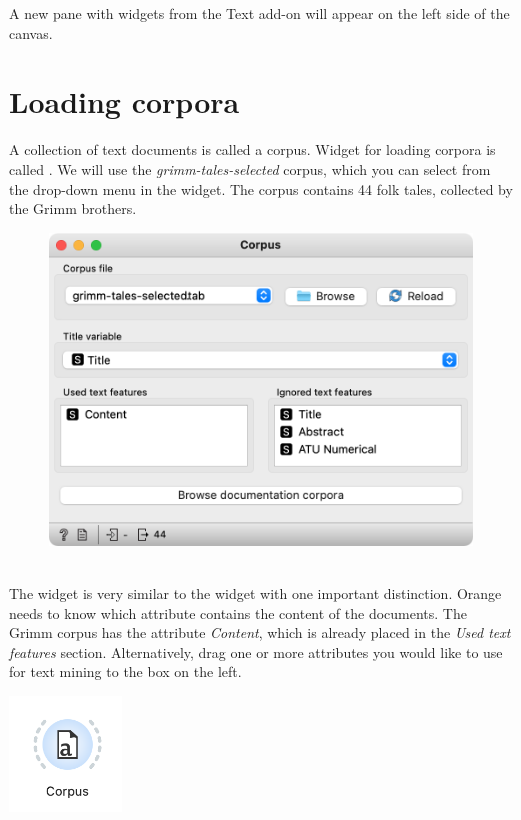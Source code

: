 A new pane with widgets from the Text add-on will appear on the left side of the canvas.

\newpage

\section{Loading corpora}

A collection of text documents is called a corpus. Widget for loading corpora is called . We will use the \emph{grimm-tales-selected} corpus, which you can select from the drop-down menu in the widget. The corpus contains 44 folk tales, collected by the Grimm brothers.

\vspace{-0.2cm}
\begin{figure}[h]
  \centering
  \includegraphics[width=\linewidth]{corpus.png}%
  \caption{$\;$}
\end{figure}
\vspace{-0.3cm}

The widget is very similar to the  widget with one important distinction. Orange needs to know which attribute contains the content of the documents. The Grimm corpus has the attribute \emph{Content}, which is already placed in the \emph{Used text features} section. Alternatively, drag one or more attributes you would like to use for text mining to the box on the left.

\begin{marginfigure}
      \includegraphics[width=30mm]{workflow.png}%
      \caption{$\;$}
\end{marginfigure}
